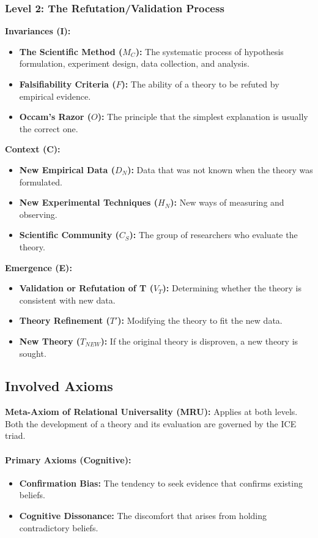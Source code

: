 \documentclass{article}
\begin{document}
\subsubsection{Level 2: The Refutation/Validation Process}
\textbf{Invariances (I):}
\begin{itemize}
\item \textbf{The Scientific Method (\(M_C\)):} The systematic process of hypothesis formulation, experiment design, data collection, and analysis.
\item \textbf{Falsifiability Criteria (\(F\)):} The ability of a theory to be refuted by empirical evidence.
\item \textbf{Occam's Razor (\(O\)):} The principle that the simplest explanation is usually the correct one.
\end{itemize}
\textbf{Context (C):}
\begin{itemize}
\item \textbf{New Empirical Data (\(D_N\)):} Data that was not known when the theory was formulated.
\item \textbf{New Experimental Techniques (\(H_N\)):} New ways of measuring and observing.
\item \textbf{Scientific Community (\(C_S\)):} The group of researchers who evaluate the theory.
\end{itemize}
\textbf{Emergence (E):}
\begin{itemize}
\item \textbf{Validation or Refutation of T (\(V_T\)):} Determining whether the theory is consistent with new data.
\item \textbf{Theory Refinement (\(T'\)):} Modifying the theory to fit the new data.
\item \textbf{New Theory (\(T_{NEW}\)):} If the original theory is disproven, a new theory is sought.
\end{itemize}

\subsection{Involved Axioms}

\textbf{Meta-Axiom of Relational Universality (MRU):} Applies at both levels. Both the development of a theory and its evaluation are governed by the ICE triad.

\paragraph{Primary Axioms (Cognitive):}
\begin{itemize}
\item \textbf{Confirmation Bias:} The tendency to seek evidence that confirms existing beliefs.
\item \textbf{Cognitive Dissonance:} The discomfort that arises from holding contradictory beliefs.
\end{itemize}
\end{document}
